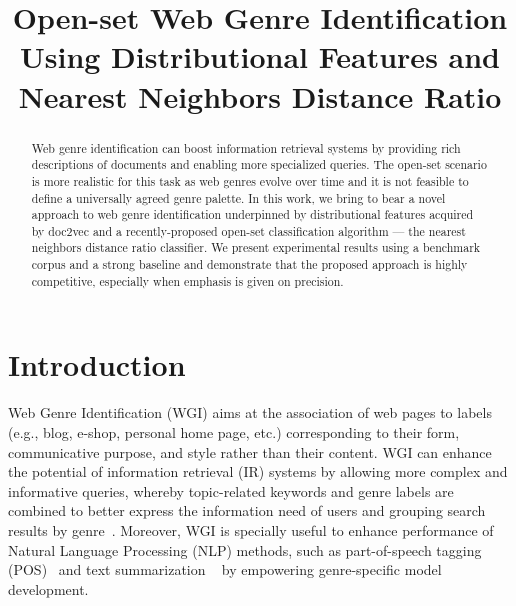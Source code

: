 \documentclass[runningheads]{llncs}
\begin{document}
\title{Open-set Web Genre Identification Using Distributional Features and Nearest Neighbors Distance Ratio}



\maketitle

\begin{abstract}
Web genre identification can boost information retrieval systems by providing rich descriptions of documents and enabling more specialized queries. The open-set scenario is more realistic for this task as web genres evolve over time and it is not feasible to define a universally agreed genre palette. In this work, we bring to bear a novel approach to web genre identification underpinned by distributional features acquired by doc2vec and a recently-proposed open-set classification algorithm --- the nearest neighbors distance ratio classifier. We present experimental results using a benchmark corpus and a strong baseline and demonstrate that the proposed approach is highly competitive, especially when emphasis is given on precision.

\end{abstract}


\section{Introduction}\label{sec:intro}
Web Genre Identification (WGI) aims at the association of web pages to labels (e.g., blog, e-shop, personal home page, etc.) corresponding to their form, communicative purpose, and style rather than their content. WGI can enhance the potential of information retrieval (IR) systems by allowing more complex and informative queries, whereby topic-related keywords and genre labels are combined to better express the information need of users and grouping search results by genre~\cite{Rosso2008,Malhotra:2017}. Moreover, WGI is specially useful to enhance performance of Natural Language Processing (NLP) methods, such as part-of-speech tagging (POS)~\cite{Nooralahzadeh2014} and text summarization ~\cite{Stewart:2009} by empowering genre-specific model development. 
\end{document}
